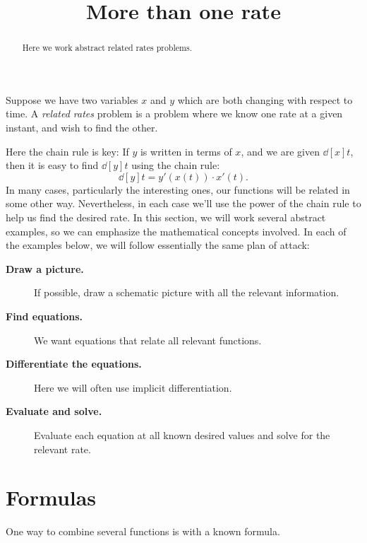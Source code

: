 \documentclass{ximera}
\title[Dig-In:]{More than one rate}
\begin{document}
\begin{abstract}
  Here we work abstract related rates problems.
\end{abstract}
\maketitle


Suppose we have two variables $x$ and $y$ which are both changing with
respect to time.  A \textit{related rates} problem is a problem where
we know one rate at a given instant, and wish to find the other.

Here the chain rule is key: If $y$ is written in terms of $x$, and we
are given $\dd[x]{t}$, then it is easy to find $\dd[y]{t}$ using the
chain rule:
\[
\dd[y]{t}=y'(x(t))\cdot x'(t).
\]
In many cases, particularly the interesting ones, our functions will
be related in some other way. Nevertheless, in each case we'll use the
power of the chain rule to help us find the desired rate. In this
section, we will work several abstract examples, so we can emphasize
the mathematical concepts involved. In each of the examples below, we will follow essentially the same plan of attack:

\begin{description}
\item[\textbf{Draw a picture.}] If possible, draw a schematic picture with all the relevant information. 
\item[\textbf{Find equations.}] We want equations that relate all
  relevant functions.
\item[\textbf{Differentiate the equations.}] Here we will often use
  implicit differentiation.
\item[\textbf{Evaluate and solve.}] Evaluate
  each equation at all known desired values and solve for the relevant
  rate.
\end{description}


\section{Formulas}

One way to combine several functions is with a known formula.
\end{document}
